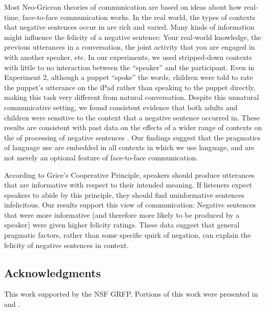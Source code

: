 \documentclass[man, noapacite]{apa2}
\begin{document}
Most Neo-Gricean theories of communication are based on ideas about how real-time, face-to-face communication works. In the real world, the types of contexts that negative sentences occur in are rich and varied. Many kinds of information might influence the felicity of a negative sentence: Your real-world knowledge, the previous utterances in a conversation, the joint activity that you are engaged in with another speaker, etc. In our experiments, we used stripped-down contexts with little to no interaction between the ``speaker'' and the participant. Even in Experiment 2, although a puppet ``spoke'' the words, children were told to rate the puppet's utterance on the iPad rather than speaking to the puppet directly, making this task very different from natural conversation. Despite this unnatural communicative setting, we found consistent evidence that both adults and children were sensitive to the context that a negative sentence occurred in. These results are consistent with past data on the effects of a wider range of contexts on the of processing of negative sentences \cite{clark1976, wason1965, glenberg1999, nieuwland2008, dale2011, nordmeyer2014}. Our findings suggest that the pragmatics of language use are embedded in all contexts in which we use language, and are not merely an optional feature of face-to-face communication.

According to Grice's Cooperative Principle, speakers should produce utterances that are informative with respect to their intended meaning. If listeners expect speakers to abide by this principle, they should find uninformative sentences infelicitous. Our results support this view of communication: Negative sentences that were more informative (and therefore more likely to be produced by a speaker) were given higher felicity ratings. These data suggest that general pragmatic factors, rather than some specific quirk of negation, can explain the felicity of negative sentences in context.

\subsection{Acknowledgments}
This work supported by the NSF GRFP. Portions of this work were presented in  and .



\setlength{\bibleftmargin}{.125in}
\setlength{\bibindent}{-\bibleftmargin}


\end{document}
